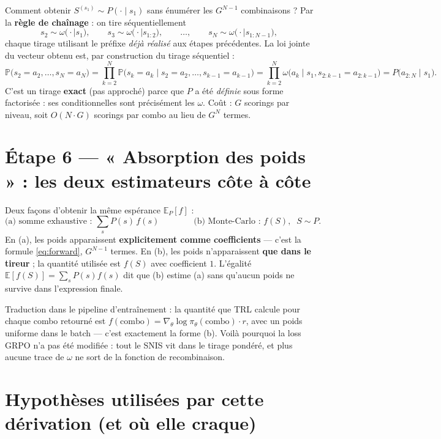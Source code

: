 \documentclass{article}
\newcommand{\pref}[2]{s_{#1:#2}}                     %
\newcommand{\w}[2]{\omega\big(#1 \mid #2\big)}       %
\newcommand{\E}{\mathbb{E}}
\newcommand{\Prob}{\mathbb{P}}
\begin{document}
Comment obtenir $S^{(s_1)} \sim P(\cdot \mid s_1)$ sans énumérer les $G^{N-1}$
combinaisons ? Par la \textbf{règle de chaînage} : on tire séquentiellement
\begin{equation}
s_2 \sim \w{\cdot}{s_1}, \qquad
s_3 \sim \w{\cdot}{\pref{1}{2}}, \qquad \ldots, \qquad
s_N \sim \w{\cdot}{\pref{1}{N-1}},
\end{equation}
chaque tirage utilisant le préfixe \emph{déjà réalisé} aux étapes précédentes.
La loi jointe du vecteur obtenu est, par construction du tirage séquentiel :
\begin{equation}
\Prob\big(s_2 = a_2, \ldots, s_N = a_N\big)
= \prod_{k=2}^{N} \Prob\big(s_k = a_k \mid s_2 = a_2, \ldots, s_{k-1} = a_{k-1}\big)
= \prod_{k=2}^{N} \w{a_k}{s_1, \pref{2}{k-1} = a_{2:k-1}}
= P\big(a_{2:N} \mid s_1\big).
\end{equation}
C'est un tirage \textbf{exact} (pas approché) parce que $P$ a été \emph{définie}
sous forme factorisée : ses conditionnelles sont précisément les $\omega$.
Coût : $G$ scorings par niveau, soit $O(N \cdot G)$ scorings par combo au lieu de
$G^N$ termes.

\section{Étape 6 --- « Absorption des poids » : les deux estimateurs côte à côte}

Deux façons d'obtenir la même espérance $\E_P[f]$ :
\begin{equation}
\text{(a) somme exhaustive : } \sum_{s} P(s)\, f(s)
\qquad\qquad
\text{(b) Monte-Carlo : } f(S), \;\; S \sim P.
\end{equation}
En (a), les poids apparaissent \textbf{explicitement comme coefficients} --- c'est
la formule \eqref{eq:forward}, $G^{N-1}$ termes. En (b), les poids n'apparaissent
\textbf{que dans le tireur} ; la quantité utilisée est $f(S)$ avec coefficient $1$.
L'égalité $\E[f(S)] = \sum_s P(s) f(s)$ dit que (b) estime (a) sans qu'aucun poids
ne survive dans l'expression finale.

Traduction dans le pipeline d'entraînement : la quantité que TRL calcule pour chaque
combo retourné est $f(\text{combo}) = \nabla_\theta \log \pi_\theta(\text{combo})
\cdot r$, avec un poids uniforme dans le batch --- c'est exactement la forme (b).
Voilà pourquoi la loss GRPO n'a pas été modifiée : tout le SNIS vit dans le tirage
pondéré, et plus aucune trace de $\omega$ ne sort de la fonction de recombinaison.

\section{Hypothèses utilisées par cette dérivation (et où elle craque)}
\end{document}
